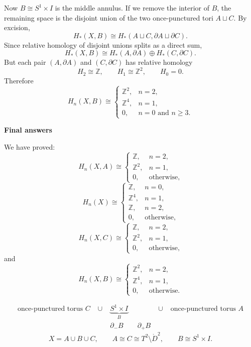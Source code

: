 \begin{solution}
Now \(B\cong S^1\times I\) is the middle annulus. If we remove the interior of \(B\), the remaining space is the disjoint union of the two once-punctured tori \(A\sqcup C\). By excision,
\[
H_*(X,B)\cong H_*(A\sqcup C,\partial A\sqcup \partial C).
\]
Since relative homology of disjoint unions splits as a direct sum,
\[
H_*(X,B)\cong H_*(A,\partial A)\oplus H_*(C,\partial C).
\]
But each pair \((A,\partial A)\) and \((C,\partial C)\) has relative homology
\[
H_2\cong \mathbb Z,\qquad
H_1\cong \mathbb Z^2,\qquad
H_0=0.
\]
Therefore
\[
\boxed{
	H_n(X,B)\cong
	\begin{cases}
		\mathbb Z^2, & n=2,\\[1mm]
		\mathbb Z^4, & n=1,\\[1mm]
		0, & n=0\text{ and }n\ge 3.
	\end{cases}
}
\]


\medskip
\noindent\textbf{Final answers}\par
\smallskip


We have proved:
\[
\boxed{
	H_n(X,A)\cong
	\begin{cases}
		\mathbb Z, & n=2,\\
		\mathbb Z^2, & n=1,\\
		0, & \text{otherwise,}
	\end{cases}
}
\]
\[
\boxed{
	H_n(X)\cong
	\begin{cases}
		\mathbb Z, & n=0,\\
		\mathbb Z^4, & n=1,\\
		\mathbb Z, & n=2,\\
		0, & \text{otherwise,}
	\end{cases}
}
\]
\[
\boxed{
	H_n(X,C)\cong
	\begin{cases}
		\mathbb Z, & n=2,\\
		\mathbb Z^2, & n=1,\\
		0, & \text{otherwise,}
	\end{cases}
}
\]
and
\[
\boxed{
	H_n(X,B)\cong
	\begin{cases}
		\mathbb Z^2, & n=2,\\
		\mathbb Z^4, & n=1,\\
		0, & \text{otherwise.}
	\end{cases}
}
\]



\[
\boxed{
\begin{array}{ccccc}
\text{once-punctured torus }C
&\;\cup\;&
\underbrace{S^1\times I}_{B}
&\;\cup\;&
\text{once-punctured torus }A\\[1mm]
&&\partial_-B\qquad\partial_+B&&
\end{array}}
\]
\[
X=A\cup B\cup C,\qquad
A\cong C\cong T^2\setminus\mathring D^2,\qquad
B\cong S^1\times I.
\]



\end{solution}
